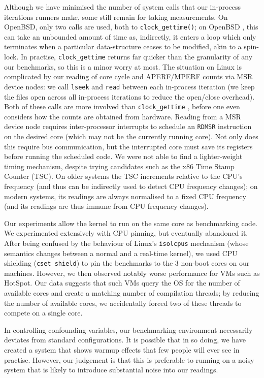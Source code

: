 \documentclass[preprint,numbers,10pt]{sigplanconf}
\begin{document}
Although we have minimised the number of system calls that our in-process
iterations runners make, some still remain for taking measurements. On
OpenBSD, only two calls are used, both to \texttt{clock\_gettime()};
on OpenBSD , this can take an
unbounded amount of time as, indirectly, it enters a loop which only terminates
when a particular data-structure ceases to be modified, akin to a spin-lock. In
practise, \texttt{clock\_gettime} returns far quicker than the granularity
of any our benchmarks, so this is a minor worry at most. The situation
on Linux is complicated by our reading of core cycle and APERF/MPERF
counts via MSR device nodes: we call \texttt{lseek} and \texttt{read}
between each in-process iteration (we keep the files open across all
in-process iterations to reduce the open/close overhead). Both of
these calls are more involved than \texttt{clock\_gettime} , before one even considers how the counts are obtained from
hardware. Reading from a MSR device node requires inter-processor interrupts to
schedule an \texttt{RDMSR} instruction on the desired core (which may not be the
currently running core). Not only does this require bus communication, but the
interrupted core must save its registers before running the scheduled code. We
were not able to find a lighter-weight timing mechanism, despite trying
candidates such as the x86 Time Stamp Counter (TSC). On older systems the TSC
increments relative to the CPU's frequency (and thus can be indirectly used to
detect CPU frequency changes); on modern systems, its readings are always
normalised to a fixed CPU frequency (and its readings are thus immune from CPU
frequency changes).

Our experiments allow the kernel to run on the same core as benchmarking code.
We experimented extensively with CPU pinning, but eventually abandoned it. After
being confused by the behaviour of Linux's \texttt{isolcpus} mechanism (whose
semantics changes between a normal and a real-time kernel), we used CPU shielding
(\texttt{cset shield}) to pin the benchmarks to the 3 non-boot cores on our
machines. However, we then observed notably worse performance for VMs such as
HotSpot. Our data suggests that such VMs query the OS for the number of
available cores and create a matching number of compilation threads; by reducing
the number of available cores, we accidentally forced two of these threads to
compete on a single core.

In controlling confounding variables, our benchmarking environment necessarily
deviates from standard configurations. It is possible that in so doing, we have
created a system that shows warmup effects that few people will ever see in
practise. However, our judgement is that this is preferable to running on a
noisy system that is likely to introduce substantial noise into our readings.
\end{document}
